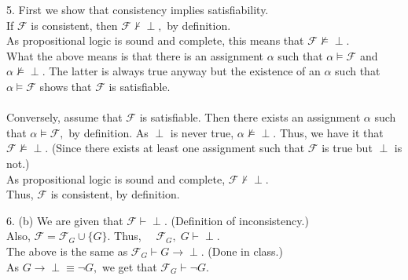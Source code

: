 \documentclass{article}
\begin{document}
\hrulefill

5. First we show that consistency implies satisfiability.\\
If $\mathcal{F}$ is consistent, then $\mathcal{F} \not\vdash \perp,$ by definition.\\
As propositional logic is sound and complete, this means that $\mathcal{F} \not\models \perp.$\\
What the above means is that there is an assignment $\alpha$ such that $\alpha \models \mathcal{F}$ and $\alpha \not\models\perp.$ The latter is always true anyway but the existence of an $\alpha$ such that $\alpha \models \mathcal{F}$ shows that $\mathcal{F}$ is satisfiable.\\~\\
Conversely, assume that $\mathcal{F}$ is satisfiable. Then there exists an assignment $\alpha$ such that $\alpha \models \mathcal{F},$ by definition. As $\perp$ is never true, $\alpha \not \models \perp.$ Thus, we have it that $\mathcal{F}\not\models \perp.$ (Since there exists at least one assignment such that $\mathcal{F}$ is true but $\perp$ is not.)\\
As propositional logic is sound and complete, $\mathcal{F} \not \vdash \perp.$ \\
Thus, $\mathcal{F}$ is consistent, by definition.

\hrulefill

6. %
(b) We are given that $\mathcal{F} \vdash \perp.$ \hfill (Definition of inconsistency.)\\
Also, $\mathcal{F} = \mathcal{F}_G \cup \{G\}.$ Thus, $\quad \mathcal{F}_G, \;G \vdash \perp.$\\
The above is the same as $\mathcal{F}_G \vdash G \to \perp.$ \hfill (Done in class.)\\
As $G \to \perp \equiv \neg G,$ we get that $\mathcal{F}_G \vdash \neg G.$
\end{document}
